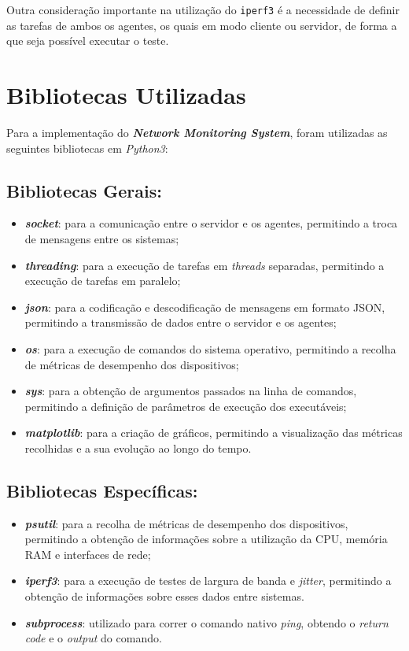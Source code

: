 \documentclass[a4paper,12pt]{scrreprt}
\begin{document}
Outra consideração importante na utilização do \texttt{iperf3} é a necessidade de
definir as tarefas de ambos os agentes, os quais em modo cliente ou servidor,
de forma a que seja possível executar o teste.

\section{Bibliotecas Utilizadas}

Para a implementação do \textbf{\textit{Network Monitoring System}}, foram utilizadas
as seguintes bibliotecas em \textit{Python3}:

\subsection{Bibliotecas Gerais:}
\begin{itemize}
    \item \textbf{\textit{socket}}: para a comunicação entre o servidor e os agentes,
    permitindo a troca de mensagens entre os sistemas;
    \item \textbf{\textit{threading}}: para a execução de tarefas em \textit{threads} separadas,
    permitindo a execução de tarefas em paralelo;
    \item \textbf{\textit{json}}: para a codificação e descodificação de mensagens em formato JSON,
    permitindo a transmissão de dados entre o servidor e os agentes;
    \item \textbf{\textit{os}}: para a execução de comandos do sistema operativo, permitindo a
    recolha de métricas de desempenho dos dispositivos;
    \item \textbf{\textit{sys}}: para a obtenção de argumentos passados na linha de comandos,
    permitindo a definição de parâmetros de execução dos executáveis;
    \item \textbf{\textit{matplotlib}}: para a criação de gráficos, permitindo a visualização
    das métricas recolhidas e a sua evolução ao longo do tempo.
\end{itemize}

\subsection{Bibliotecas Específicas:}
\begin{itemize}
    \item \textbf{\textit{psutil}}: para a recolha de métricas de desempenho dos dispositivos,
    permitindo a obtenção de informações sobre a utilização da CPU, memória RAM e interfaces de rede;
    \item \textbf{\textit{iperf3}}: para a execução de testes de largura de banda e \textit{jitter},
    permitindo a obtenção de informações sobre esses dados entre sistemas.
    \item \textbf{\textit{subprocess}}: utilizado para correr o comando nativo \textit{ping}, obtendo
    o \textit{return code} e o \textit{output} do comando.
\end{itemize}
\end{document}
